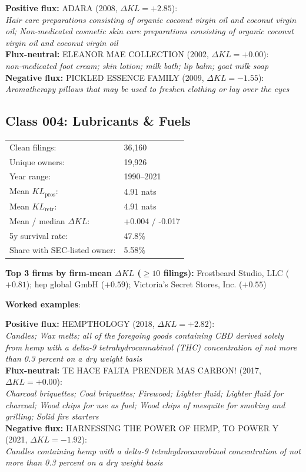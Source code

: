   \textbf{Positive flux:} \textsc{ADARA} (2008, $\Delta KL=+2.85$):\\
  \textit{Hair care preparations consisting of organic coconut virgin oil and coconut virgin oil; Non-medicated cosmetic skin care preparations consisting of organic coconut virgin oil and coconut virgin oil}\\
  \textbf{Flux-neutral:} \textsc{ELEANOR MAE COLLECTION} (2002, $\Delta KL=+0.00$):\\
  \textit{non-medicated foot cream; skin lotion; milk bath; lip balm; goat milk soap}\\
  \textbf{Negative flux:} \textsc{PICKLED ESSENCE FAMILY} (2009, $\Delta KL=-1.55$):\\
  \textit{Aromatherapy pillows that may be used to freshen clothing or lay over the eyes}\\

\subsection*{Class 004: Lubricants \& Fuels}
\label{app:industry-004}

\begin{tabular}{ll}
Clean filings: & 36,160 \\
Unique owners: & 19,926 \\
Year range: & 1990--2021 \\
Mean $KL_\text{pros}$: & 4.91 nats \\
Mean $KL_\text{retr}$: & 4.91 nats \\
Mean / median $\Delta KL$: & +0.004 / -0.017 \\
5y survival rate: & 47.8\% \\
Share with SEC-listed owner: & 5.58\% \\
\end{tabular}

\textbf{Top 3 firms by firm-mean $\Delta KL$ ($\geq 10$ filings):} Frostbeard Studio, LLC ($+0.81$); hep global GmbH ($+0.59$); Victoria's Secret Stores, Inc. ($+0.55$)

\textbf{Worked examples}:

  \textbf{Positive flux:} \textsc{HEMPTHOLOGY} (2018, $\Delta KL=+2.82$):\\
  \textit{Candles; Wax melts; all of the foregoing goods containing CBD derived solely from hemp with a delta-9 tetrahydrocannabinol (THC) concentration of not more than 0.3 percent on a dry weight basis}\\
  \textbf{Flux-neutral:} \textsc{TE HACE FALTA PRENDER MAS CARBON!} (2017, $\Delta KL=+0.00$):\\
  \textit{Charcoal briquettes; Coal briquettes; Firewood; Lighter fluid; Lighter fluid for charcoal; Wood chips for use as fuel; Wood chips of mesquite for smoking and grilling; Solid fire starters}\\
  \textbf{Negative flux:} \textsc{HARNESSING THE POWER OF HEMP, TO POWER Y} (2021, $\Delta KL=-1.92$):\\
  \textit{Candles containing hemp with a delta-9 tetrahydrocannabinol concentration of not more than 0.3 percent on a dry weight basis}\\

